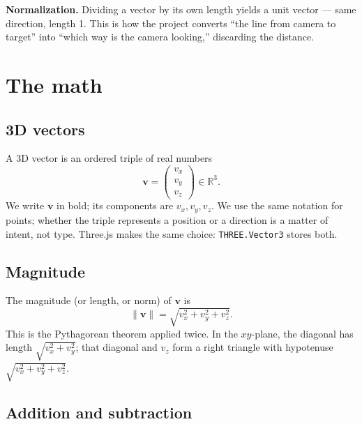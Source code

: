 \documentclass{article}
\begin{document}
\noindent\textbf{Normalization.} Dividing a vector by its own length yields a
unit vector --- same direction, length 1. This is how the project converts
``the line from camera to target'' into ``which way is the camera looking,''
discarding the distance.

\begin{center}
\end{center}

\section{The math}

\subsection{3D vectors}

A 3D vector is an ordered triple of real numbers
\[
\mathbf{v} = \begin{pmatrix} v_x \\ v_y \\ v_z \end{pmatrix} \in \mathbb{R}^3.
\]
We write $\mathbf{v}$ in bold; its components are $v_x, v_y, v_z$. We use the
same notation for points; whether the triple represents a position or a
direction is a matter of intent, not type. Three.js makes the same choice:
\texttt{THREE.Vector3} stores both.

\subsection{Magnitude}

The magnitude (or length, or norm) of $\mathbf{v}$ is
\[
\|\mathbf{v}\| = \sqrt{v_x^2 + v_y^2 + v_z^2}.
\]
This is the Pythagorean theorem applied twice. In the $xy$-plane, the
diagonal has length $\sqrt{v_x^2 + v_y^2}$; that diagonal and $v_z$ form a
right triangle with hypotenuse $\sqrt{v_x^2 + v_y^2 + v_z^2}$.

\subsection{Addition and subtraction}
\end{document}
